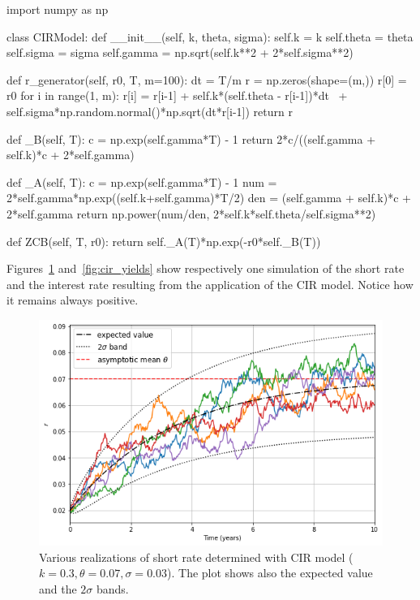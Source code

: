 \begin{ipython}
import numpy as np

class CIRModel:
    def __init__(self, k, theta, sigma):
        self.k = k
        self.theta = theta
        self.sigma = sigma
        self.gamma = np.sqrt(self.k**2 + 2*self.sigma**2)

    def r_generator(self, r0, T, m=100):
        dt = T/m
        r = np.zeros(shape=(m,))
        r[0] = r0
        for i in range(1, m):
            r[i] = r[i-1] + self.k*(self.theta - r[i-1])*dt \
                   + self.sigma*np.random.normal()*np.sqrt(dt*r[i-1])
        return r

    def _B(self, T):
        c = np.exp(self.gamma*T) - 1
        return 2*c/((self.gamma + self.k)*c + 2*self.gamma)

    def _A(self, T):
        c = np.exp(self.gamma*T) - 1
        num = 2*self.gamma*np.exp((self.k+self.gamma)*T/2)
        den = (self.gamma + self.k)*c + 2*self.gamma
        return np.power(num/den, 2*self.k*self.theta/self.sigma**2)

    def ZCB(self, T, r0):
        return self._A(T)*np.exp(-r0*self._B(T))
\end{ipython}

Figures~\ref{fig:cir_path} and~\ref{fig:cir_yields} show respectively one simulation of the short rate and the interest rate resulting from the application of the CIR model. Notice how it remains always positive.

\begin{figure}[htb]
\centering
\includegraphics[width=0.7\linewidth]{figures/cir_short_rate}
\caption{Various realizations of short rate determined with CIR model ($k=0.3, \theta=0.07, \sigma=0.03$). The plot shows also the expected value and the $2\sigma$ bands.}
\label{fig:cir_path}
\end{figure}

